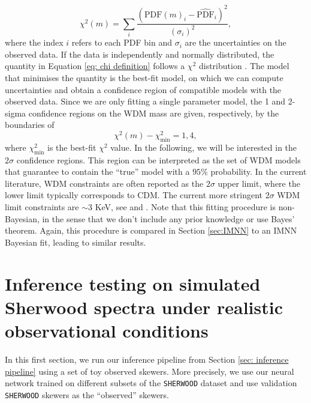 \begin{equation}\label{eq: chi definition}
    \chi^2 (m)=\sum_i \frac{(\text{PDF}(m)_i-\widehat{\text{PDF}}_i)^2}{(\sigma_i)^2},
\end{equation}
where the index $i$ refers to each PDF bin and $\sigma_i$ are the uncertainties on the observed data. If the data is independently and normally distributed, the quantity in Equation \ref{eq: chi definition} follows a $\chi^2$ distribution \cite{numerical_recipees_c}. The model that minimises the quantity is the best-fit model, on which we can compute uncertainties and obtain a confidence region of compatible models with the observed data. Since we are only fitting a single parameter model, the 1 and 2-sigma confidence regions on the WDM mass are given, respectively, by the boundaries of 
\begin{equation}\label{eq:sigma chi square}
    \chi^2(m)-\chi^2_{\text{min}}=1,4,
\end{equation}
where $\chi^2_{\text{min}}$ is the best-fit $\chi^2$ value.
In the following, we will be interested in the $2\sigma$ confidence regions. This region can be interpreted as the set of WDM models that guarantee to contain the ``true'' model with a $95\%$ probability. In the current literature, WDM constraints are often reported as the $2\sigma$ upper limit, where the lower limit typically corresponds to CDM. The current more stringent $2\sigma$
WDM limit constraints are $\sim 3$ KeV, see \cite{Villasenor_2023} and \cite{sherwood_wdm}.
Note that this fitting procedure is non-Bayesian, in the sense that we don't include any prior knowledge or use Bayes' theorem. Again, this procedure is compared in Section \ref{sec:IMNN} to an IMNN Bayesian fit, leading to similar results. 





\section{Inference testing on simulated Sherwood spectra under realistic observational conditions}\label{sec:inference test sherwood}
In this first section, we run our inference pipeline from Section \ref{sec: inference pipeline} using a set of toy observed skewers. More precisely, we use our neural network trained on different subsets of the \texttt{SHERWOOD} dataset and use validation \texttt{SHERWOOD} skewers as the ``observed'' skewers.


